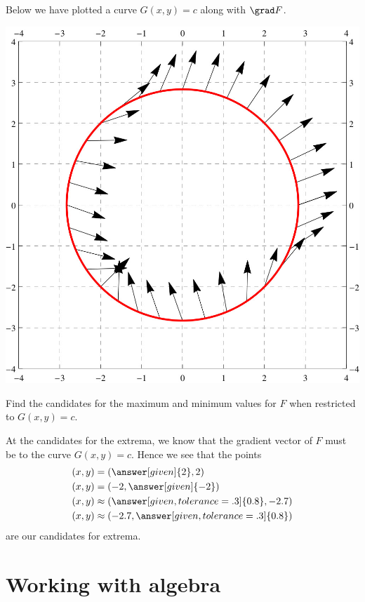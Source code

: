 \documentclass{ximera}
\begin{document}
\begin{example}
  Below we have plotted a curve $G(x,y) = c$ along with $\grad F$.
  \begin{image}
    \includegraphics{curveVectors1.jpg}
  \end{image}
  Find the candidates for the maximum and minimum values for $F$ when
  restricted to $G(x,y) = c$.
  \begin{explanation}
    At the candidates for the extrema, we know that the gradient
    vector of $F$ must be
     to
    the curve $G(x,y) = c$. Hence we
    see that the points
    \begin{align*}
      (x,y) &= (\answer[given]{2},2)\\
      (x,y) &= (-2,\answer[given]{-2})\\
      (x,y) &\approx (\answer[given,tolerance=.3]{0.8},-2.7)\\
      (x,y) &\approx (-2.7,\answer[given,tolerance=.3]{0.8})
    \end{align*}
    are our candidates for extrema.
  \end{explanation}
\end{example}


\section{Working with algebra}
\end{document}
